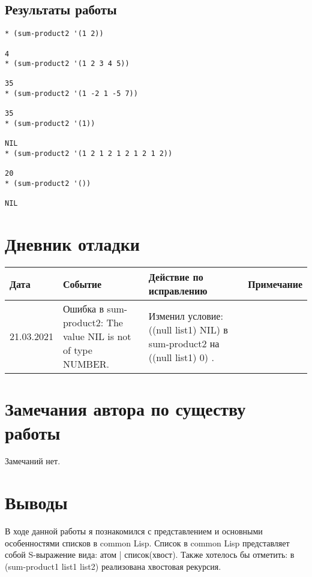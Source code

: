 \documentclass[12pt]{article}
\begin{document}
\subsection{Результаты работы}
\begin{verbatim}
* (sum-product2 '(1 2))

4
* (sum-product2 '(1 2 3 4 5))

35
* (sum-product2 '(1 -2 1 -5 7))

35
* (sum-product2 '(1))

NIL
* (sum-product2 '(1 2 1 2 1 2 1 2 1 2))

20
* (sum-product2 '())

NIL
\end{verbatim}
%

\section{Дневник отладки}
\begin{tabular}{|p{50pt}|p{130pt}|p{130pt}|p{70pt}|}
\hline
Дата & Событие & Действие по исправлению & Примечание \\ \hline
21.03.2021 & Ошибка в sum-product2: The value NIL is not of type NUMBER.   & Изменил условие: ((null list1) NIL) в sum-product2 на ((null list1) 0) .  &\\
\hline
\end{tabular}

\section{Замечания автора по существу работы}
Замечаний нет.

\section{Выводы}
В ходе данной работы я познакомился с представлением и основными особенностями списков в common Lisp. Список в common Lisp представляет собой S-выражение вида: атом | список(хвост). Также хотелось бы отметить: в (sum-product1 list1 list2)  реализована хвостовая рекурсия.
\end{document}
